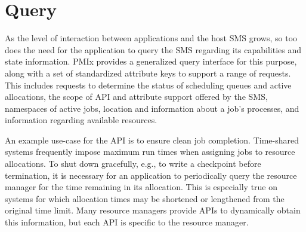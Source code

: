 
%

%

%


\section{Query}
\label{chap:api_proc_mgmt:query}

As the level of interaction between applications and the host \ac{SMS} grows, so too does the need for the application to query the \ac{SMS} regarding its capabilities and state information. \ac{PMIx} provides a generalized query interface for this purpose, along with a set of standardized attribute keys to support a range of requests. This includes requests to determine the status of scheduling queues and active allocations, the scope of \ac{API} and attribute support offered by the \ac{SMS}, namespaces of active jobs, location and information about a job's processes, and information regarding available resources.

An example use-case for the  \ac{API} is to ensure clean job completion. Time-shared systems frequently impose maximum run times when assigning jobs to resource allocations. To shut down gracefully, e.g., to write a checkpoint before termination, it is necessary for an application to periodically query the resource manager for the time remaining in its allocation. This is especially true on systems for which allocation times may be shortened or lengthened from the original time limit. Many resource managers provide \acp{API} to dynamically obtain this information, but each \ac{API} is specific to the resource manager.

